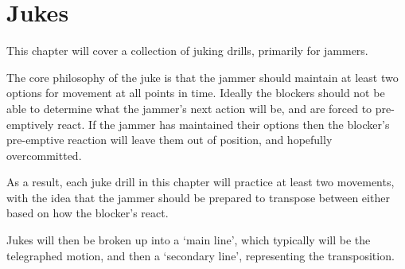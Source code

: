 \chapter{Jukes}

This chapter will cover a collection of juking drills, primarily for jammers.


The core philosophy of the juke is that the jammer should maintain at least two options for movement at all points in time.  
Ideally the blockers should not be able to determine what the jammer's next action will be, and are forced to pre-emptively react.    
If the jammer has maintained their options then the blocker's pre-emptive reaction will leave them out of position, and hopefully overcommitted.  


As a result, each juke drill in this chapter will practice at least two movements, with the idea that the jammer should be prepared to transpose between either based on how the blocker's react.

Jukes will then be broken up into a `main line', which typically will be the telegraphed motion, and then a `secondary line', representing the transposition.    
